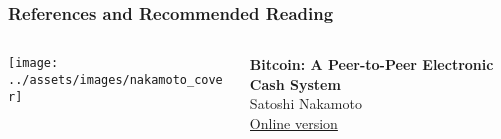 \documentclass[]{beamer}
\begin{document}
\begin{frame}%
\frametitle{References and Recommended Reading}

		\begin{columns}[T]
			\begin{column}{0.1\textwidth}
					\texttt{[image: ../assets/images/nakamoto\_cover]}
			\end{column} %
			\begin{column}{0.8\textwidth}
				\textbf{Bitcoin: A Peer-to-Peer Electronic Cash System} \\ 
				Satoshi Nakamoto \\
				\link \href{https://bitcoin.org/bitcoin.pdf}{Online version}
			\end{column}
		\end{columns}
	\vspace{1.5em}
	\vspace{1.5em}
	

\end{frame}
\end{document}
